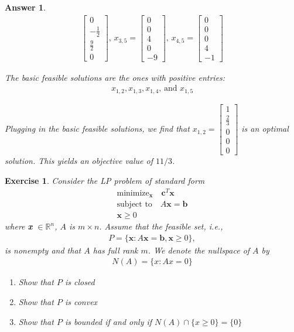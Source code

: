 \documentclass[12pt]{article}
\theoremstyle{colon}
\newtheorem{exercise}{Exercise}
\newtheorem*{answer}{Answer}
\begin{document}
\begin{answer}
\begin{align*}
\begin{bmatrix}
      0 \\
      -\frac{1}{2} \\
      \frac{9}{2} \\
      0
    \end{bmatrix}\text{, } x_{3,5} = \begin{bmatrix}
      0 \\
      0 \\
      4 \\
      0 \\
      -9
    \end{bmatrix}\text{, } x_{4,5} = \begin{bmatrix}
      0 \\
      0 \\
      0 \\
      4 \\
      -1
    \end{bmatrix}
  \end{align*}

  The basic feasible solutions are the ones with positive entries:
  \begin{gather*}
    x_{1,2}, x_{1,3}, x_{1,4} \text{, and } x_{1,5}
  \end{gather*}

  Plugging in the basic feasible solutions, we find that $x_{1,2} = \begin{bmatrix}
      1 \\
      \frac{2}{3} \\
      0 \\
      0 \\
      0
  \end{bmatrix}$ is an optimal solution. This yields an objective value of $11/3$.
\end{answer}

\clearpage

\begin{exercise}
  Consider the LP problem of standard form
  \begin{gather*}
    \text{minimize}_{\textbf{x}} \quad \textbf{c}^T \textbf{x} \\
    \text{subject to} \quad A \textbf{x} = \textbf{b} \\
    \textbf{x} \geq 0
  \end{gather*}
  where \textbf{x} $\in \mathbb{R}^n$, $A$ is $m \times n$. Assume that the feasible set, i.e.,
  \begin{gather*}
    P = \{ \textbf{x} : A \textbf{x} = \textbf{b}, \textbf{x} \geq 0 \},
  \end{gather*}
  is nonempty and that $A$ has full rank $m$. We denote the nullspace of $A$ by
  \begin{gather*}
    N(A) = \{ x : Ax = 0 \}
  \end{gather*}
  \begin{enumerate}
    \item Show that $P$ is closed
    \item Show that $P$ is convex
    \item Show that $P$ is bounded if and only if $N(A) \cap \{ x \geq 0 \} = \{ 0 \}$
  \end{enumerate}
\end{exercise}
\end{document}
